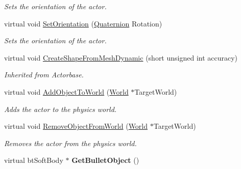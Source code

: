 \begin{DoxyCompactItemize}
\begin{DoxyCompactList}\small\item\em Sets the orientation of the actor. \item\end{DoxyCompactList}\item 
virtual void \hyperlink{classphys_1_1ActorSoft_ad57b502da0658de31a4b3a9bb9be7900}{SetOrientation} (\hyperlink{classphys_1_1Quaternion}{Quaternion} Rotation)
\begin{DoxyCompactList}\small\item\em Sets the orientation of the actor. \item\end{DoxyCompactList}\item 
\hypertarget{classphys_1_1ActorSoft_aaa8bb89969831c8bc727d7aba230d862}{
virtual void \hyperlink{classphys_1_1ActorSoft_aaa8bb89969831c8bc727d7aba230d862}{CreateShapeFromMeshDynamic} (short unsigned int accuracy)}
\label{d4/d23/classphys_1_1ActorSoft_aaa8bb89969831c8bc727d7aba230d862}

\begin{DoxyCompactList}\small\item\em Inherited from Actorbase. \item\end{DoxyCompactList}\item 
virtual void \hyperlink{classphys_1_1ActorSoft_a5f97915d1cda0d048853718714a26d93}{AddObjectToWorld} (\hyperlink{classphys_1_1World}{World} $\ast$TargetWorld)
\begin{DoxyCompactList}\small\item\em Adds the actor to the physics world. \item\end{DoxyCompactList}\item 
virtual void \hyperlink{classphys_1_1ActorSoft_ab65d106fcc1ee5243a990e7b42326bf0}{RemoveObjectFromWorld} (\hyperlink{classphys_1_1World}{World} $\ast$TargetWorld)
\begin{DoxyCompactList}\small\item\em Removes the actor from the physics world. \item\end{DoxyCompactList}\item 
\hypertarget{classphys_1_1ActorSoft_a33b3fa2d6fcbb4e742e53fbde22f21a9}{
virtual btSoftBody $\ast$ {\bfseries GetBulletObject} ()}
\label{d4/d23/classphys_1_1ActorSoft_a33b3fa2d6fcbb4e742e53fbde22f21a9}

\end{DoxyCompactItemize}
